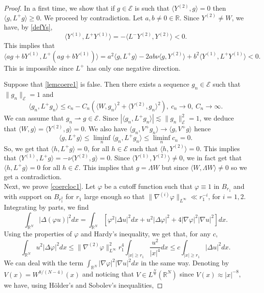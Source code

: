 \documentclass[a4paper,two-side,10pt]{amsart}
\newcommand{\R}{\mathbb{R}}
\numberwithin{equation}{section}
\begin{document}
\begin{proof}
In a first time, we show that if $g\in \mathcal{E}$ is such that $\langle Y^{(2)} ,g\rangle =0$ then $\langle g ,L^+ g \rangle \geq 0$. We proceed by contradiction. Let $a,b\neq 0 \in \R$. Since $Y^{(2)} \neq W$, we have, by \eqref{defYs}, 
$$\langle Y^{(1)} , L^+ Y^{(1)}\rangle =- \langle L^- Y^{(2)} , Y^{(2)} \rangle <0.$$
This implies that
$$\langle ag +b Y^{(1)} , L^+ (ag + b Y^{(1)})  \rangle =a^2 \langle g, L^+ g \rangle - 2 ab \nu \langle g, Y^{(2)} \rangle +b^2 \langle Y^{(1)} ,L^+ Y^{(1)} \rangle <0 .$$
This is impossible since $L^+$ has only one negative direction. 

 Suppose that \eqref{lemcoere1} is false. Then there exists a sequence $g_n \in \mathcal{E}$ such that $\|g_n\|_{\mathcal{E}}=1$ and 
$$\langle g_n ,L^+ g_n\rangle \leq c_n - C_n  (\langle W,g_n\rangle^2 + \langle Y^{(2)} ,g_n \rangle^2 ),\ c_n \rightarrow 0,\ C_n\rightarrow \infty.$$
We can assume that $g_n \rightharpoonup g\in \mathcal{E}$. Since $|\langle g_n ,L^+ g_n \rangle| \lesssim \|g_n\|^2_{\mathcal{E}} = 1$, we deduce that
$\langle W,g\rangle = \langle Y^{(2)} ,g \rangle =0$. We also have $\langle g_n ,V^+ g_n \rangle \rightarrow \langle g ,V^+ g \rangle$ hence
$$\langle g, L^+ g \rangle \leq \liminf_n \langle g_n ,L^+ g_n\rangle \leq \liminf_n c_n =0.$$
So, we get that $\langle h, L^+ g \rangle =0$, for all $h\in \mathcal{E}$ such that $\langle h, Y^{(2)}\rangle =0$. This implies that $\langle Y^{(1)} , L^+ g \rangle =-\nu \langle Y^{(2)} , g\rangle =0$. Since $\langle Y^{(1)} , Y^{(2)} \rangle \neq 0$, we in fact get that $\langle h,L^+ g\rangle =0$ for all $h\in \mathcal{E}$. This implies that $g= \Lambda W$ but since $\langle W, \Lambda W \rangle \neq 0$ so we get a contradiction.\\
Next, we prove \eqref{coercloc1}. Let $\varphi$ be a cutoff function such that $\varphi \equiv 1$ in $B_{r_1}$ and with support on $B_{r_1^2}$ for $r_1$ large enough so that $\|\nabla^{(i)} \varphi \|_{L^\infty} \ll r_1^{-i}$, for $i=1,2$. Integrating by parts, we find
$$\int_{\R^N} |\Delta (\varphi u)|^2 dx = \int_{\R^N}[ \varphi^2 |\Delta u|^2 dx + u^2 |\Delta \varphi|^2 + 4 |\nabla\varphi|^2  |\nabla u|^2 ]dx.    $$
Using the properties of $\varphi$ and Hardy's inequality, we get that, for any $c$, 
$$\int_{\R^N}  u^2 |\Delta \varphi|^2 dx\leq \|\nabla^{(2)} \varphi \|_{L^\infty}^2 r_1^4 \int_{|x|\geq r_1}  \dfrac{u^2}{|x|^4} dx \leq c \int_{|x|\geq r_1} |\Delta u|^2 dx. $$
We can deal with the term $\int_{\R^N} |\nabla\varphi|^2  |\nabla u|^2 dx$ in the same way. Denoting by $V(x)=W^{8/(N-4)}(x) $ and noticing that $V\in L^{\frac{N}{4}}(\R^N)$ since $V(x) \approx |x|^{-8}$, we have, using H\" older's and Sobolev's inequalities,

\end{proof}
\end{document}
